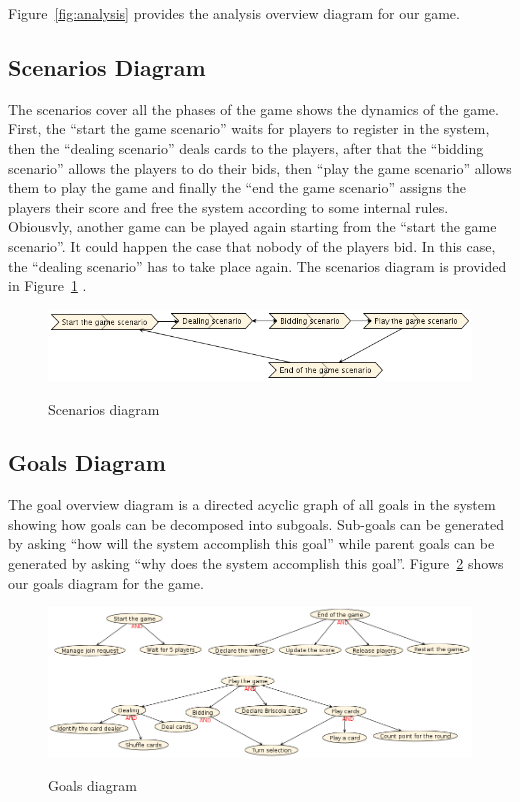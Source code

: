 \documentclass[a4paper]{article}
\begin{document}
Figure~\ref{fig:analysis} provides the analysis overview diagram for our game.


\subsection{Scenarios Diagram}

The scenarios cover all the phases of the game shows the dynamics of the game. First, the ``start the game scenario'' waits for players to register in the system, then the ``dealing scenario'' deals cards to the players, after that the ``bidding scenario'' allows the players to do their bids, then ``play the game scenario'' allows them to play the game and finally the ``end the game scenario'' assigns the players their score and free the system according to some internal rules. Obiousvly, another game can be played again starting from the ``start the game scenario''. It could happen the case that nobody of the players bid. In this case, the ``dealing scenario'' has to take place again. The scenarios diagram is provided in Figure~\ref{fig:scenarios} .

\begin{figure}[htp]
  \centering
  \includegraphics[keepaspectratio,scale=0.5]{pdt/images/system_specification/scenarios.png}
  \label{fig:scenarios}
  \caption{Scenarios diagram}
\end{figure}

\subsection{Goals Diagram}

The goal overview diagram is a directed acyclic graph of all goals in the system showing how goals can be decomposed into subgoals. Sub-goals can be generated by asking ``how will the system accomplish this goal'' while parent goals can be generated by asking ``why does the system accomplish this goal''. Figure~\ref{fig:goals} shows our goals diagram for the game.

\begin{figure}[htp]
  \centering
  \includegraphics[keepaspectratio,scale=0.4]{pdt/images/system_specification/goal_overview.png}
  \label{fig:goals}
  \caption{Goals diagram}
\end{figure}
  
\end{document}
